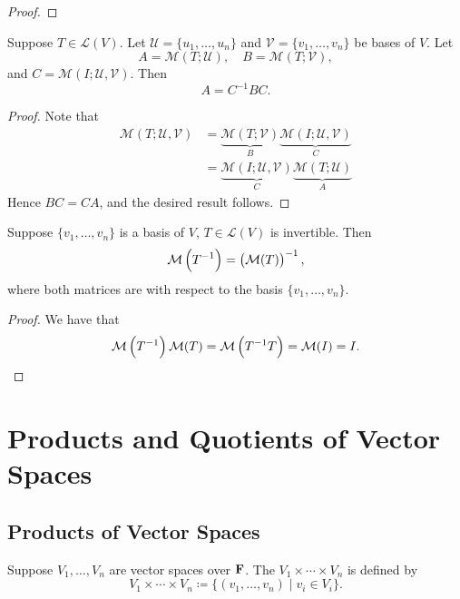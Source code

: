 \begin{proof}

\end{proof}

\begin{theorem}
Suppose $T\in\mathcal{L}(V)$. Let $\mathcal{U}=\{u_1,\dots,u_n\}$ and $\mathcal{V}=\{v_1,\dots,v_n\}$ be bases of $V$. Let
\[A=\mathcal{M}(T;\mathcal{U}),\quad B=\mathcal{M}(T;\mathcal{V}),\]
and $C=\mathcal{M}(I;\mathcal{U},\mathcal{V})$. Then
\begin{equation}
A=C^{-1}BC.
\end{equation}
\end{theorem}

\begin{proof}
Note that
\begin{align*}
\mathcal{M}(T;\mathcal{U},\mathcal{V})
&=\underbrace{\mathcal{M}(T;\mathcal{V})}_{B}\underbrace{\mathcal{M}(I;\mathcal{U},\mathcal{V})}_{C}\\
&=\underbrace{\mathcal{M}(I;\mathcal{U},\mathcal{V})}_{C}\underbrace{\mathcal{M}(T;\mathcal{U})}_{A}
\end{align*}
Hence $BC=CA$, and the desired result follows.
\end{proof}

\begin{proposition}
Suppose $\{v_1,\dots,v_n\}$ is a basis of $V$, $T\in\mathcal{L}(V)$ is invertible. Then
\[\mathcal{M}\left(T^{-1}\right)=\left(\mathcal{M}(T)\right)^{-1},\]
where both matrices are with respect to the basis $\{v_1,\dots,v_n\}$.
\end{proposition}

\begin{proof}
We have that
\[\mathcal{M}\left(T^{-1}\right)\mathcal{M}(T)=\mathcal{M}\left(T^{-1}T\right)=\mathcal{M}(I)=I.\]
\end{proof}
\pagebreak

\section{Products and Quotients of Vector Spaces}
\subsection{Products of Vector Spaces}
\begin{definition}[Product]
Suppose $V_1,\dots,V_n$ are vector spaces over $\mathbf F$. The  $V_1\times\cdots\times V_n$ is defined by
\[V_1\times\cdots\times V_n\coloneqq\{(v_1,\dots,v_n)\mid v_i\in V_i\}.\]
\end{definition}

